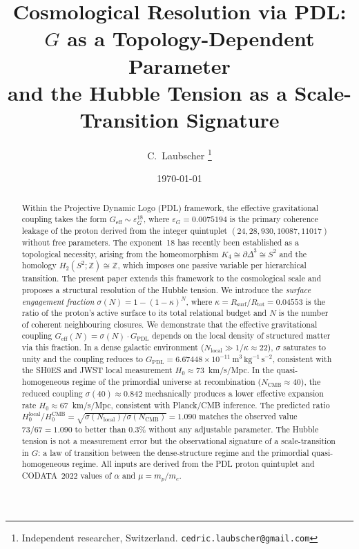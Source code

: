 \documentclass[11pt,a4paper]{article}
\theoremstyle{definition}
\newcommand{\PDL}{\textnormal{PDL}}
\newcommand{\Rsurf}{R_{\mathrm{surf}}}
\newcommand{\Rtot}{R_{\mathrm{tot}}}
\newcommand{\epsg}{\varepsilon_G}
\newcommand{\Kfour}{K_4}
\newcommand{\Sfour}{\partial\Delta^3}
\newcommand{\Hk}[1]{H_{#1}}
\newcommand{\Geff}{G_{\mathrm{eff}}}
\newcommand{\GPDL}{G_{\mathrm{PDL}}}
\newcommand{\Hzero}{H_0}
\newcommand{\kap}{\kappa}
\newcommand{\sig}{\sigma}
\begin{document}
\title{%
  Cosmological Resolution via PDL:\\
  $G$ as a Topology-Dependent Parameter\\
  and the Hubble Tension as a Scale-Transition Signature%
}
\author{%
  C.~Laubscher%
  \thanks{Independent researcher, Switzerland.
    \texttt{cedric.laubscher@gmail.com}}\\[4pt]%
}
\date{\small \today}
\maketitle
\begin{abstract}
Within the Projective Dynamic Logo (\PDL) framework, the effective gravitational coupling takes the form $\Geff \sim \epsg^{18}$, where $\epsg = 0.0075194$ is the primary coherence leakage of the proton derived from the integer quintuplet $(24, 28, 930, 10087, 11017)$ without free parameters. The exponent~18 has recently been established as a topological necessity, arising from the homeomorphism $\Kfour \cong \Sfour \cong S^2$ and the homology $\Hk{2}(S^2;\mathbb{Z}) \cong \mathbb{Z}$, which imposes one passive variable per hierarchical transition.\cite{Topology_18_PDL_2026} The present paper extends this framework to the cosmological scale and proposes a structural resolution of the Hubble tension. We introduce the \emph{surface engagement fraction} $\sig(N) = 1 - (1-\kap)^N$, where $\kap = \Rsurf/\Rtot = 0.04553$ is the ratio of the proton's active surface to its total relational budget and $N$ is the number of coherent neighbouring closures. We demonstrate that the effective gravitational coupling $\Geff(N) = \sig(N)\cdot\GPDL$ depends on the local density of structured matter via this fraction. In a dense galactic environment ($N_{\mathrm{local}} \gg 1/\kap \approx 22$), $\sig$ saturates to unity and the coupling reduces to $\GPDL = 6.67448\times 10^{-11}\ \mathrm{m^3\,kg^{-1}\,s^{-2}}$, consistent with the SH0ES and JWST local measurement $\Hzero \approx 73$~km/s/Mpc. In the quasi-homogeneous regime of the primordial universe at recombination ($N_{\mathrm{CMB}} \approx 40$), the reduced coupling $\sig(40) \approx 0.842$ mechanically produces a lower effective expansion rate $\Hzero \approx 67$~km/s/Mpc, consistent with Planck/CMB inference. The predicted ratio $\Hzero^{\mathrm{local}}/\Hzero^{\mathrm{CMB}} = \sqrt{\sig(N_{\mathrm{local}})/\sig(N_{\mathrm{CMB}})} = 1.090$ matches the observed value $73/67 = 1.090$ to better than $0.3\%$ without any adjustable parameter. The Hubble tension is not a measurement error but the observational signature of a scale-transition in $G$: a law of transition between the dense-structure regime and the primordial quasi-homogeneous regime. All inputs are derived from the PDL proton quintuplet and CODATA~2022 values of $\alpha$ and $\mu = m_p/m_e$.
\end{abstract}
\end{document}
